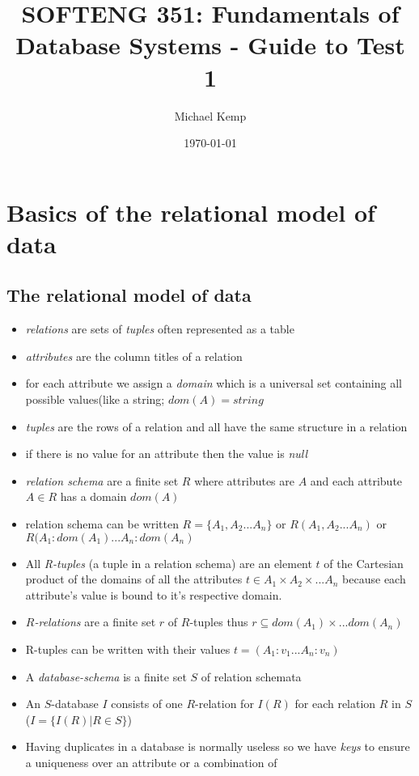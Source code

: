 \documentclass[10pt,a4paper]{article}
\author{Michael Kemp}
\title{SOFTENG 351: Fundamentals of Database Systems - Guide to Test 1}
\date{\today}
\begin{document}
\maketitle
\tableofcontents
\newpage


\section{Basics of the relational model of data}
	\subsection{The relational model of data}
		\begin{itemize}
			\item \textit{relations} are sets of \textit{tuples} often represented as a table
			\item \textit{attributes} are the column titles of a relation
			\item for each attribute we assign a \textit{domain} which is a universal set containing all possible values(like a string; $dom(A) = string$
			\item \textit{tuples} are the rows of a relation and all have the same structure in a relation
			\item if there is no value for an attribute then the value is \textit{null}
			\item \textit{relation schema} are a finite set $R$ where attributes are $A$ and each attribute $A\in R$ has a domain $dom(A)$
			\item relation schema can be written $R = \{A_1, A_2 ... A_n\}$ or $R(A_1, A_2 ... A_n)$ or $R(A_1:dom(A_1) ... A_n:dom(A_n)$
			\item All \textit{R-tuples} (a tuple in a relation schema) are an element $t$ of the Cartesian product of the domains of all the attributes $t \in A_1 \times A_2 \times ... A_n$ because each attribute's value is bound to it's respective domain.
			\item \textit{$R$-relations} are a finite set $r$ of $R$-tuples thus $r\subseteq dom(A_1)\times...dom(A_n)$
			\item R-tuples can be written with their values $t = (A_1:v_1...A_n:v_n)$
			\item A \textit{database-schema} is a finite set $S$ of relation schemata
			\item An $S$-database $I$ consists of one $R$-relation for $I(R)$ for each relation $R$ in $S$ ($I = \{I(R)|R\in S\}$)
			\item Having duplicates in a database is normally useless so we have \textit{keys} to ensure a uniqueness over an attribute or a combination of

\end{itemize}
\end{document}
